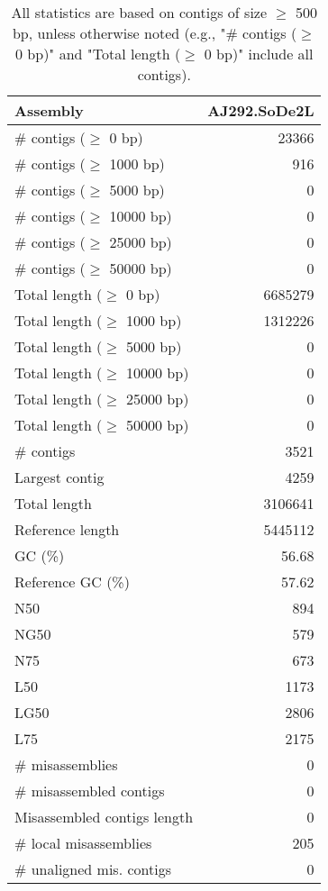 \documentclass[12pt,a4paper]{article}
\begin{document}
\begin{table}[ht]
\begin{center}
\caption{All statistics are based on contigs of size $\geq$ 500 bp, unless otherwise noted (e.g., "\# contigs ($\geq$ 0 bp)" and "Total length ($\geq$ 0 bp)" include all contigs).}
\begin{tabular}{|l*{1}{|r}|}
\hline
Assembly & AJ292.SoDe2L \\ \hline
\# contigs ($\geq$ 0 bp) & 23366 \\ \hline
\# contigs ($\geq$ 1000 bp) & 916 \\ \hline
\# contigs ($\geq$ 5000 bp) & 0 \\ \hline
\# contigs ($\geq$ 10000 bp) & 0 \\ \hline
\# contigs ($\geq$ 25000 bp) & 0 \\ \hline
\# contigs ($\geq$ 50000 bp) & 0 \\ \hline
Total length ($\geq$ 0 bp) & 6685279 \\ \hline
Total length ($\geq$ 1000 bp) & 1312226 \\ \hline
Total length ($\geq$ 5000 bp) & 0 \\ \hline
Total length ($\geq$ 10000 bp) & 0 \\ \hline
Total length ($\geq$ 25000 bp) & 0 \\ \hline
Total length ($\geq$ 50000 bp) & 0 \\ \hline
\# contigs & 3521 \\ \hline
Largest contig & 4259 \\ \hline
Total length & 3106641 \\ \hline
Reference length & 5445112 \\ \hline
GC (\%) & 56.68 \\ \hline
Reference GC (\%) & 57.62 \\ \hline
N50 & 894 \\ \hline
NG50 & 579 \\ \hline
N75 & 673 \\ \hline
L50 & 1173 \\ \hline
LG50 & 2806 \\ \hline
L75 & 2175 \\ \hline
\# misassemblies & 0 \\ \hline
\# misassembled contigs & 0 \\ \hline
Misassembled contigs length & 0 \\ \hline
\# local misassemblies & 205 \\ \hline
\# unaligned mis. contigs & 0 \\ \hline

\end{tabular}
\end{center}
\end{table}
\end{document}
